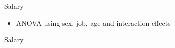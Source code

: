 \documentclass[xcolor=dvipsnames]{beamer}
\begin{document}
\begin{frame}{\centerline{\huge\textcolor{bscuro}{Salary}}}
\begin{itemize}
	\item ANOVA using sex, job, age and interaction effects
\end{itemize}

\begin{figure}[!ht] 
	\centering
\end{figure}
\end{frame} 

\begin{frame}{\centerline{\huge\textcolor{bscuro}{Salary}}}
\begin{figure}[!ht] 
	\centering
\end{figure}
\end{frame}
\end{document}
